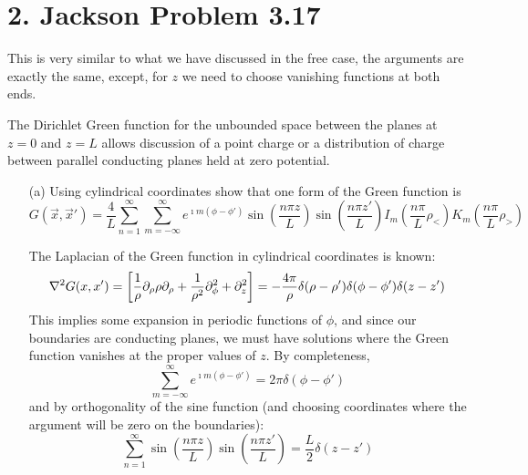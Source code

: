 \documentclass[a4paper,twoside]{article}
\begin{document}
\section*{2. Jackson Problem 3.17}
This is very similar to what we have discussed in the free case, the arguments are exactly the same, except, for $ z $ we need to choose vanishing functions at both ends.

\hr
The Dirichlet Green function for the unbounded space between the planes at $ z = 0 $ and $ z = L $ allows discussion of a point charge or a distribution of charge between parallel conducting planes held at zero potential.
\begin{itemize}
    \item[(a)] Using cylindrical coordinates show that one form of the Green function is
        \begin{equation}
            G( \vec{x}, \vec{x}' ) = \frac{4}{L} \sum_{n=1}^{\infty} \sum_{m=-\infty}^{\infty} e^{\imath m(\phi - \phi')} \sin\left( \frac{n \pi z}{L} \right) \sin\left( \frac{n \pi z'}{L} \right) I_m\left( \frac{n \pi}{L} \rho_< \right) K_m\left( \frac{n \pi}{L} \rho_> \right)
        \end{equation}
        \begin{tcolorbox}[breakable]
            The Laplacian of the Green function in cylindrical coordinates is known:
            \begin{equation}
                \laplacian{G(x,x')} = \left[ \frac{1}{\rho}\partial_\rho \rho \partial_\rho + \frac{1}{\rho^2} \partial^2_\phi + \partial^2_z \right] =- \frac{4 \pi}{\rho} \delta (\rho - \rho') \delta (\phi-\phi') \delta (z-z')
            \end{equation}
            This implies some expansion in periodic functions of $ \phi $, and since our boundaries are conducting planes, we must have solutions where the Green function vanishes at the proper values of $ z $. By completeness,
            \begin{equation}
                \sum_{m=- \infty}^{\infty} e^{\imath m (\phi - \phi')} = 2\pi\delta(\phi-\phi')
            \end{equation}
            and by orthogonality of the sine function (and choosing coordinates where the argument will be zero on the boundaries):
            \begin{equation}
                \sum_{n=1}^{\infty} \sin \left( \frac{n \pi z}{L} \right) \sin \left( \frac{n \pi z'}{L} \right) = \frac{L}{2}\delta(z-z')
            \end{equation}

\end{tcolorbox}
\end{itemize}
\end{document}
